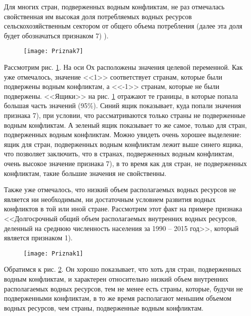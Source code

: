 \documentclass[a4paper, 12pt]{article}
\theoremstyle{plain} %
\theoremstyle{definition} %
\theoremstyle{remark} %
\begin{document}
Для многих стран, подверженных водным конфликтам, не раз отмечалась свойственная им высокая доля потребляемых водных ресурсов сельскохозяйственным сектором от общего объема потребления (далее эта доля будет обозначаться признаком 7) ).
 \begin{figure}
	 	\centering		
		\texttt{[image: Priznak7]}
		\caption{}\label{priznak_7}
\end{figure}
Рассмотрим рис. \ref{priznak_7}. На оси Ох расположены значения целевой переменной. Как уже отмечалось, значение <<1>> соответствует странам, которые были подвержены водным конфликтам, а <<-1>> странам, которые не были подвержены. <<Ящики>> на рис. \ref{priznak_7} отражают те границы, в которые попала большая часть значений (95\%). Синий ящик показывает, куда попали значения признака 7), при условии, что рассматриваются только страны не подверженные водным конфликтам. А зеленый ящик показывает то же самое, только для стран, подверженных водным конфликтам. Можно увидеть очень хорошее выделение: ящик для стран, подверженных водным конфликтам лежит выше синего ящика, что позволяет заключить, что в странах, подверженных водным конфликтам, очень высокое значение признака 7), в то время как для стран, не подверженных конфликтам, такие большие значения не свойственны. 

Также уже отмечалось, что низкий объем располагаемых водных ресурсов не является ни необходимым, ни достаточным условием развития водных конфликтов в той или иной стране. Рассмотрим этот факт на примере признака <<Долгосрочный общий объем располагаемых внутренних водных ресурсов, деленный на среднюю численность населения за 1990 – 2015 год>>, который является признаком 1).
\begin{figure}
	\centering		
	\texttt{[image: Priznak1]}
	\caption{}\label{priznak_1}
\end{figure}
Обратимся к рис. \ref{priznak_1}. Он хорошо показывает, что хоть для стран, подверженных водным конфликтам, и характерен относительно низкий объем внутренних располагаемых водных ресурсов, тем не менее есть страны, которые, будучи не подверженными конфликтам, в то же время располагают меньшим объемом водных ресурсов, чем страны, подверженные водным конфликтам. 
\end{document}
